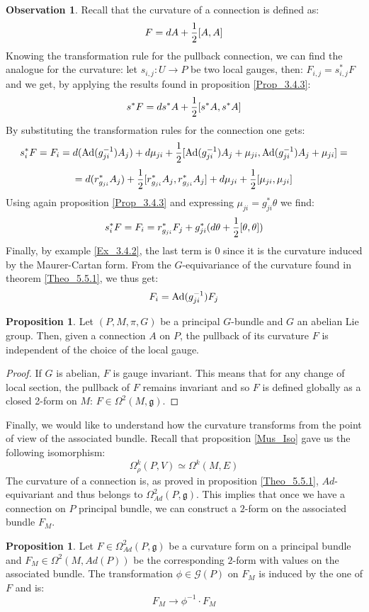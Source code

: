 \documentclass[12pt,a4paper]{report}
\theoremstyle{definition}
\theoremstyle{Theorem}
\newtheorem{Prop}[Def]{Proposition}
\theoremstyle{definition}
\theoremstyle{definition}
\newtheorem{Obs}[Def]{Observation}
\begin{document}
	\begin{Obs}\label{Obs_7.2.2}
		Recall that the curvature of a connection is defined as:
		$$F=dA+{1\over 2}[A,A]$$
		Knowing the transformation rule for the pullback connection, we can find the analogue for the curvature: let $s_{i,j}:U\rightarrow P$ be two local gauges, then: $F_{i,j}=s_{i,j}^*F$ and we get, by applying the results found in proposition \ref{Prop_3.4.3}:
		$$s^*F=ds^*A+{1\over 2}[s^*A,s^*A]$$
		By substituting the transformation rules for the connection one gets:
		$$s_i^*F=F_i=d(\hbox{Ad}(g_{ji}^{-1})A_j)+d\mu_{ji}+{1\over 2}[\hbox{Ad}(g_{ji}^{-1})A_j+\mu_{ji},\hbox{Ad}(g_{ji}^{-1})A_j+\mu_{ji}]=$$
		$$=d(r^*_{g_{ji}}A_j)+{1\over 2}[r^*_{g_{ji}}A_j,r^*_{g_{ji}}A_j]+d\mu_{ji}+{1\over 2}[\mu_{ji},\mu_{ji}]$$
		Using again proposition \ref{Prop_3.4.3} and expressing $\mu_{ji}=g_{ji}^*\theta$ we find:
		$$s_i^*F=F_i=r^*_{g_{ji}}F_j+g_{ji}^*(d\theta+{1\over 2}[\theta,\theta])$$
		Finally, by example \ref{Ex_3.4.2}, the last term is 0 since it is the curvature induced by the Maurer-Cartan form. From the $G$-equivariance of the curvature found in theorem \ref{Theo_5.5.1}, we thus get:
		$$F_i=\hbox{Ad}(g_{ji}^{-1})F_j$$
	\end{Obs}
	\begin{Prop}\label{Prop_7.2.2}
		Let $(P,M,\pi,G)$ be a principal $G$-bundle and $G$ an abelian Lie group. Then, given a connection $A$ on $P$, the pullback of its curvature $F$ is independent of the choice of the local gauge.
	\end{Prop}
	\begin{proof}
		If $G$ is abelian, $F$ is gauge invariant. This means that for any change of local section, the pullback of $F$ remains invariant and so $F$ is defined globally as a closed 2-form on $M$: $F\in \Omega^2(M,\mathfrak{g})$.
	\end{proof}
	Finally, we would like to understand how the curvature transforms from the point of view of the associated bundle. Recall that proposition \ref{Mus_Iso} gave us the following isomorphism:
	$$\Omega^k_\rho(P,V)\simeq \Omega^k(M,E)$$
	The curvature of a connection is, as proved in proposition \ref{Theo_5.5.1}, $Ad$-equivariant and thus belongs to $\Omega^2_{Ad}(P,\mathfrak{g})$. This implies that once we have a connection on $P$ principal bundle, we can construct a $2$-form on the associated bundle $F_M$.
	\begin{Prop}\label{Prop_7.2.3}
		Let $F\in \Omega^2_{Ad}(P,\mathfrak{g})$ be a curvature form on a principal bundle and $F_M\in\Omega^2(M,Ad(P))$ be the corresponding $2$-form with values on the associated bundle. The transformation $\phi\in\mathcal{G}(P)$ on $F_M$ is induced by the one of $F$ and is:
		$$F_M\rightarrow \phi^{-1}\cdot F_M$$
	\end{Prop}
\end{document}
